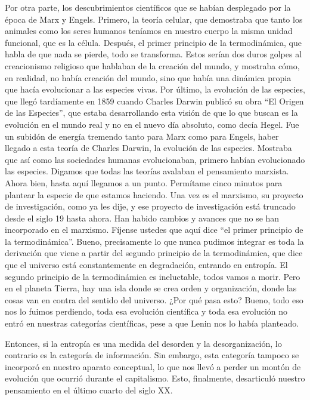 \documentclass[
  jou,
  floatsintext,
  longtable,
  a4paper,
  nolmodern,
  notxfonts,
  notimes,
  12pt,
  colorlinks=true,linkcolor=blue,citecolor=blue,urlcolor=blue]{apa7}
\begin{document}
Por otra parte, los descubrimientos científicos que se habían desplegado
por la época de Marx y Engels. Primero, la teoría celular, que
demostraba que tanto los animales como los seres humanos teníamos en
nuestro cuerpo la misma unidad funcional, que es la célula. Después, el
primer principio de la termodinámica, que habla de que nada se pierde,
todo se transforma. Estos serían dos duros golpes al creacionismo
religioso que hablaban de la creación del mundo, y mostraba cómo, en
realidad, no había creación del mundo, sino que había una dinámica
propia que hacía evolucionar a las especies vivas. Por último, la
evolución de las especies, que llegó tardíamente en 1859 cuando Charles
Darwin publicó su obra ``El Origen de las Especies'', que estaba
desarrollando esta visión de que lo que buscan es la evolución en el
mundo real y no en el nuevo día absoluto, como decía Hegel. Fue un
subidón de energía tremendo tanto para Marx como para Engels, haber
llegado a esta teoría de Charles Darwin, la evolución de las especies.
Mostraba que así como las sociedades humanas evolucionaban, primero
habían evolucionado las especies. Digamos que todas las teorías avalaban
el pensamiento marxista. Ahora bien, hasta aquí llegamos a un punto.
Permítame cinco minutos para plantear la especie de que estamos
haciendo. Una vez es el marxismo, su proyecto de investigación, como ya
les dije, y ese proyecto de investigación está truncado desde el siglo
19 hasta ahora. Han habido cambios y avances que no se han incorporado
en el marxismo. Fíjense ustedes que aquí dice ``el primer principio de
la termodinámica''. Bueno, precisamente lo que nunca pudimos integrar es
toda la derivación que viene a partir del segundo principio de la
termodinámica, que dice que el universo está constantemente en
degradación, entrando en entropía. El segundo principio de la
termodinámica es ineluctable, todos vamos a morir. Pero en el planeta
Tierra, hay una isla donde se crea orden y organización, donde las cosas
van en contra del sentido del universo. ¿Por qué pasa esto? Bueno, todo
eso nos lo fuimos perdiendo, toda esa evolución científica y toda esa
evolución no entró en nuestras categorías científicas, pese a que Lenin
nos lo había planteado.

Entonces, si la entropía es una medida del desorden y la
desorganización, lo contrario es la categoría de información. Sin
embargo, esta categoría tampoco se incorporó en nuestro aparato
conceptual, lo que nos llevó a perder un montón de evolución que ocurrió
durante el capitalismo. Esto, finalmente, desarticuló nuestro
pensamiento en el último cuarto del siglo XX.
\end{document}
